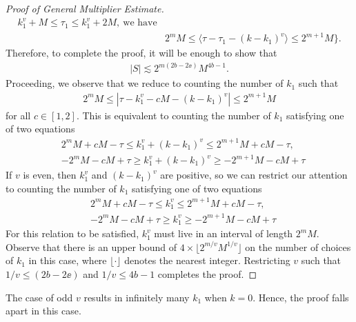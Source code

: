 \begin{proof}[Proof of General Multiplier Estimate]
\begin{equation*}
\begin{split}
  k_{1}^{v} + M \le \tau_{1} \le k_{1}^{v} + 2M, \ \text{we have}
  \\
  & 2^{m} M \le \langle \tau - \tau_{1} - (k - k_{1})^{v} \rangle  \le 2^{m+1}M \}.
\end{split}
\end{equation*}
%
Therefore, to complete the proof, it will be enough to show that
%
%
\begin{equation*}
\begin{split}
  | S | \lesssim 2^{m(2b - 2 \ee)}M^{4b-1}.
\end{split}
\end{equation*}
%
Proceeding, we observe that we reduce to counting the number of $k_{1}$ such that
%
%
%
\begin{equation*}
\begin{split}
  2^{m} M \le | \tau - k_{1}^{v} - cM  - (k - k_{1})^{v}| \le 2^{m+1}M
\end{split}
\end{equation*}
%
for all $c \in [1,2]$.
This is equivalent to counting the number of $k_{1}$ satisfying one of two equations 
%
%
%
\begin{equation*}
\begin{split}
  & 2^{m}M + cM - \tau \le k_{1}^{v} + (k - k_{1})^{v} \le 2^{m+1}M + cM - \tau,
  \\
  & 
  - 2^{m}M - cM  + \tau \ge   k_{1}^{v} + (k - k_{1})^{v}  \ge -2^{m+1}M - cM + \tau
\end{split}
\end{equation*}
%
%
%
%
If $v$ is even, then $k_{1}^{v}$ and $(k - k_{1})^{v}$ are positive, so we can restrict our attention to counting the number of $k_{1}$ satisfying one of two equations
\begin{equation}
  \label{ijj}
\begin{split}
  & 2^{m}M + cM - \tau \le k_{1}^{v}  \le 2^{m+1}M + cM - \tau,
  \\
  & 
  - 2^{m}M - cM  + \tau \ge   k_{1}^{v}  \ge -2^{m+1}M - cM + \tau
\end{split}
\end{equation}
For this relation to be satisfied, $k_{1}^{v}$ must live in an interval of length $2^{m}M$. Observe that there is an upper bound of  $4 \times \lfloor 2^{m/v} M^{1/v} \rfloor$ on the number of choices of $k_{1}$ in this case, where $\lfloor \cdot \rfloor$ denotes the nearest integer. Restricting $v$ such that $1/v \le (2b - 2 \ee)$ and $1/v \le 4b-1$ completes the proof.
\end{proof}
%
\begin{framed} The case of odd $v$ results in infinitely many $k_{1}$ when $k=0$. Hence, the proof falls apart in this case.
\end{framed}
